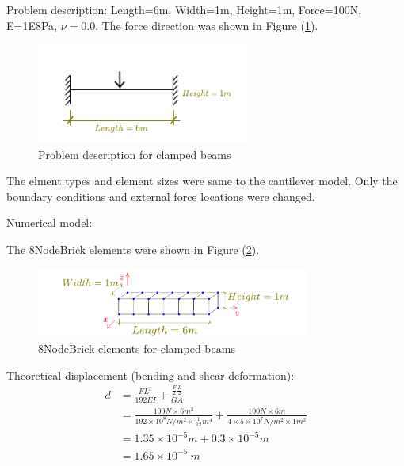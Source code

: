 \documentclass[fleqn,11pt,letter]{article}
\begin{document}
Problem description: Length=6m, Width=1m, Height=1m, Force=100N, E=1E8Pa, $\nu=0.0$. The force direction was shown in Figure (\ref{fig Problem description for clamped beams}). 

\begin{figure}[H]
  \centering
  \includegraphics[width=7cm]{../Figure_files/8NodeBrick/clamped_beam.pdf}
  \caption{Problem description for clamped beams}
  \label{fig Problem description for clamped beams}
\end{figure}




The elment types and element sizes were same to the cantilever model. Only the boundary conditions and external force locations were changed. 

Numerical model:

The 8NodeBrick elements were shown in Figure (\ref{fig 8NodeBrick elements for clamped beams}).

\begin{figure}[H]
  \centering
  \includegraphics[width=9cm]{../Figure_files/8NodeBrick/beam_8brick.pdf}
  \caption{8NodeBrick elements for clamped beams}
  \label{fig 8NodeBrick elements for clamped beams}
\end{figure}

Theoretical displacement (bending and shear deformation):
\begin{equation}
  \begin{aligned}
  d &=\frac{FL^3}{192EI}+\frac{\frac{F}{2}\frac{L}{2}}{GA}  \\
   &= \frac{100 N\times 6 m^3}{192 \times 10^8 N/m^2 \times \frac{1}{12} m^4}+ 
    \frac{100 N \times 6 m}{4\times 5\times 10^7 N/m^2\times 1 m^2}   \\
  &=1.35\times 10^{-5} m + 0.3\times 10^{-5} m  \\
  &=1.65\times 10^{-5} \ m 
    \end{aligned}
\end{equation}
\end{document}
